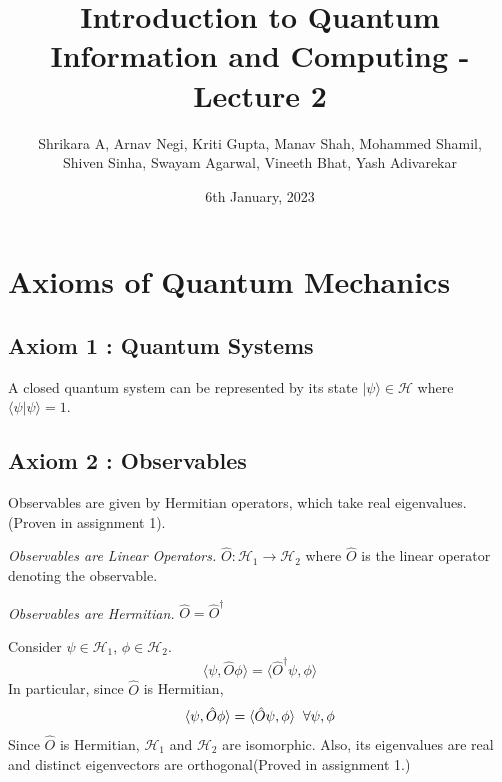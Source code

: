 \documentclass{article}
\title{Introduction to Quantum Information and Computing - Lecture 2}
\author{Shrikara A, Arnav Negi, Kriti Gupta, Manav Shah, Mohammed Shamil,\\ Shiven Sinha, Swayam Agarwal, Vineeth Bhat, Yash Adivarekar} %
\date{6th January, 2023}
\begin{document}
    

    \maketitle
    \vfill
    \tableofcontents
    \newpage


    \section{Axioms of Quantum Mechanics}
        
        \subsection{Axiom 1 : Quantum Systems}
            A closed quantum system can be represented by its state $| \psi \rangle \in \mathcal{H}$ where $\langle \psi | \psi \rangle = 1$.
        

        \subsection{Axiom 2 : Observables}
            Observables are given by Hermitian operators, which take real eigenvalues. (Proven in assignment 1). 

            \textit{Observables are Linear Operators.} $\hat{O} : \mathcal{H}_1 \rightarrow \mathcal{H}_2$ where $\hat{O}$ is the linear operator denoting the observable. 

            \textit{Observables are Hermitian.} $\hat{O} = \hat{O}^{\dagger}$

            Consider $\psi \in \mathcal{H}_1$, $\phi \in \mathcal{H}_2$.
            \begin{equation*}
                \langle \psi , \hat{O} \phi \rangle = \langle \hat{O}^{\dagger} \psi , \phi \rangle
            \end{equation*}
            In particular, since $\hat{O}$ is Hermitian, 
            \begin{align*}
                \langle \psi , \hat{O} \phi \rangle = \langle \hat{O} \psi , \phi \rangle \hspace{0.2cm}
                \forall \psi, \phi
            \end{align*}
            Since $\hat{O}$ is Hermitian, $\mathcal{H}_1$ and $\mathcal{H}_2$ are isomorphic. Also, its eigenvalues are real and distinct eigenvectors are orthogonal(Proved in assignment 1.)\\
\end{document}
